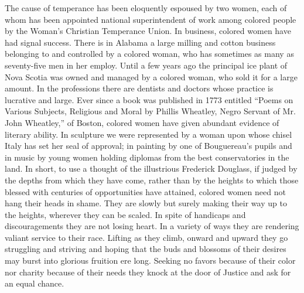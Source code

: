 \documentclass{article}
\begin{document}
The cause of temperance has been eloquently espoused by two women, each of whom
has been appointed national superintendent of work among colored people by the
Woman's Christian Temperance Union. In business, colored women have had signal
success. There is in Alabama a large milling and cotton business belonging to
and controlled by a colored woman, who has sometimes as many as seventy-five
men in her employ. Until a few years ago the principal ice plant of Nova Scotia
was owned and managed by a colored woman, who sold it for a large amount. In
the professions there are dentists and doctors whose practice is lucrative and
large. Ever since a book was published in 1773 entitled ``Poems on Various
Subjects, Religious and Moral by Phillis Wheatley, Negro Servant of Mr. John
Wheatley,'' of Boston, colored women have given abundant evidence of literary
ability. In sculpture we were represented by a woman upon whose chisel Italy
has set her seal of approval; in painting by one of Bouguereau's pupils and in
music by young women holding diplomas from the best conservatories in the land.
In short, to use a thought of the illustrious Frederick Douglass, if judged by
the depths from which they have come, rather than by the heights to which those
blessed with centuries of opportunities have attained, colored women need not
hang their heads in shame. They are slowly but surely making their way up to
the heights, wherever they can be scaled. In spite of handicaps and
discouragements they are not losing heart. In a variety of ways they are
rendering valiant service to their race. Lifting as they climb, onward and
upward they go struggling and striving and hoping that the buds and blossoms of
their desires may burst into glorious fruition ere long. Seeking no favors
because of their color nor charity because of their needs they knock at the
door of Justice and ask for an equal chance.
\end{document}

